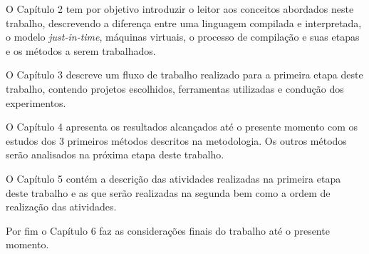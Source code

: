 O Capítulo 2 tem por objetivo introduzir o leitor aos conceitos abordados
 neste trabalho, descrevendo a diferença entre uma linguagem compilada e
 interpretada, o modelo \textit{just-in-time}, máquinas virtuais, o processo de compilação
 e suas etapas e os métodos a serem trabalhados.

O Capítulo 3 descreve um fluxo de trabalho realizado para a primeira etapa
 deste trabalho, contendo projetos escolhidos, ferramentas utilizadas e
 condução dos experimentos.

O Capítulo 4 apresenta os resultados alcançados até o presente momento com
 os estudos dos 3 primeiros métodos descritos na metodologia. Os outros
 métodos serão analisados na próxima etapa deste trabalho.

O Capítulo 5 contém a descrição das atividades realizadas na primeira
 etapa deste trabalho e as que serão realizadas na segunda bem como a ordem
 de realização das atividades.

Por fim o Capítulo 6  faz as considerações finais do trabalho até o presente
 momento.
